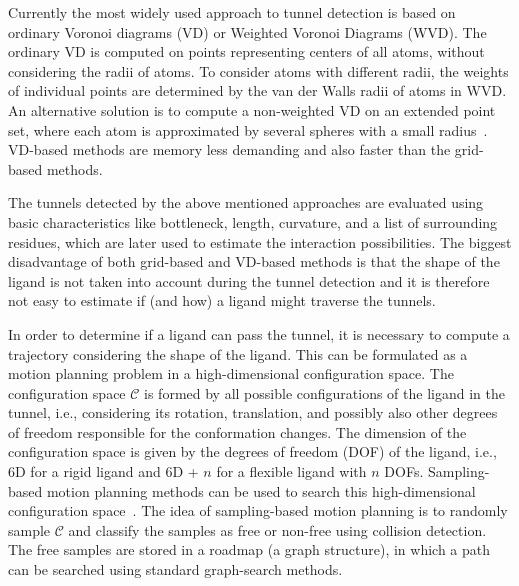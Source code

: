 \documentclass{svmult}
\def\C{\mathcal{C}}
\begin{document}
Currently the most widely used approach to tunnel detection is based on ordinary Voronoi diagrams (VD) or Weighted Voronoi Diagrams (WVD).
The ordinary VD is computed on points representing centers of all atoms, without considering the radii of atoms.
To consider atoms with different radii, the weights of individual points are determined by the van der Walls radii of atoms in WVD.
An alternative solution is to compute a non-weighted VD on an extended point set, where 
each atom is approximated by several spheres with a small radius~\cite{yaffe2008,caver3}.
VD-based methods are memory less demanding and also faster than the grid-based methods.

The tunnels detected by the above mentioned approaches are evaluated using basic characteristics like bottleneck, length, curvature, and a list of surrounding
residues, which are later used to estimate the interaction possibilities.
The biggest disadvantage of both grid-based and VD-based methods is that the shape of the ligand is not taken into account during the tunnel detection and it is therefore not easy to estimate if (and how) a ligand might traverse the tunnels.

In order to determine if a ligand can pass the tunnel, it is necessary to compute a trajectory considering the shape of the ligand.
This can be formulated as a motion planning problem in a high-dimensional configuration space.
The configuration space $\C$ is formed by all possible configurations of the ligand in the tunnel, i.e., considering its rotation, translation, and possibly also other degrees of freedom responsible for the conformation changes.
The dimension of the configuration space is given by the degrees of freedom (DOF) of the ligand, i.e., 6D for a rigid ligand and 6D + $n$ for a flexible
ligand with $n$ DOFs.
Sampling-based motion planning methods can be used to search this high-dimensional configuration space~\cite{Lav06}.
The idea of sampling-based motion planning is to randomly sample $\C$ and classify the samples as free or non-free using collision detection.
The free samples are stored in a roadmap (a graph structure), in which a path can be searched using standard graph-search methods.
\end{document}
